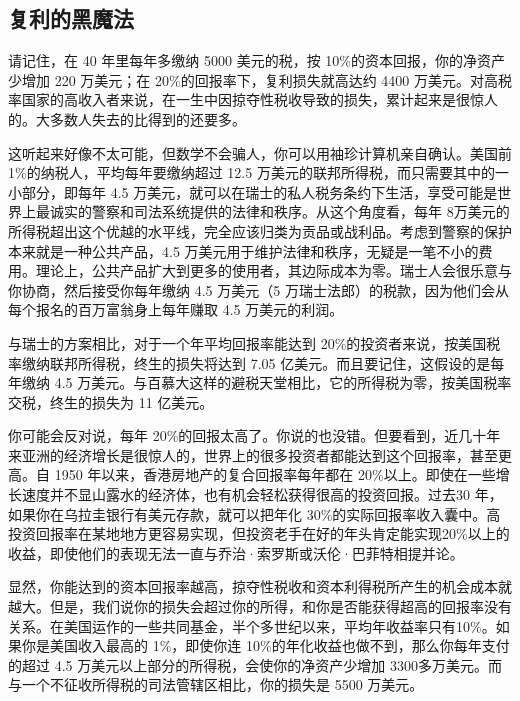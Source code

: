 \subsection{复利的黑魔法}
请记住，在 40 年里每年多缴纳 5000 美元的税，按 10\%的资本回报，你的净资产少增加 220 万美元；在 20\%的回报率下，复利损失就高达约 4400 万美元。对高税率国家的高收入者来说，在一生中因掠夺性税收导致的损失，累计起来是很惊人的。大多数人失去的比得到的还要多。

这听起来好像不太可能，但数学不会骗人，你可以用袖珍计算机亲自确认。美国前 1\%的纳税人，平均每年要缴纳超过 12.5 万美元的联邦所得税，而只需要其中的一小部分，即每年 4.5 万美元，就可以在瑞士的私人税务条约下生活，享受可能是世界上最诚实的警察和司法系统提供的法律和秩序。从这个角度看，每年 8万美元的所得税超出这个优越的水平线，完全应该归类为贡品或战利品。考虑到警察的保护本来就是一种公共产品，4.5 万美元用于维护法律和秩序，无疑是一笔不小的费用。理论上，公共产品扩大到更多的使用者，其边际成本为零。瑞士人会很乐意与你协商，然后接受你每年缴纳 4.5 万美元（5 万瑞士法郎）的税款，因为他们会从每个报名的百万富翁身上每年赚取 4.5 万美元的利润。

与瑞士的方案相比，对于一个年平均回报率能达到 20\%的投资者来说，按美国税率缴纳联邦所得税，终生的损失将达到 7.05 亿美元。而且要记住，这假设的是每年缴纳 4.5 万美元。与百慕大这样的避税天堂相比，它的所得税为零，按美国税率交税，终生的损失为 11 亿美元。

你可能会反对说，每年 20\%的回报太高了。你说的也没错。但要看到，近几十年来亚洲的经济增长是很惊人的，世界上的很多投资者都能达到这个回报率，甚至更高。自 1950 年以来，香港房地产的复合回报率每年都在 20\%以上。即使在一些增长速度并不显山露水的经济体，也有机会轻松获得很高的投资回报。过去30 年，如果你在乌拉圭银行有美元存款，就可以把年化 30\%的实际回报率收入囊中。高投资回报率在某地地方更容易实现，但投资老手在好的年头肯定能实现20\%以上的收益，即使他们的表现无法一直与乔治·索罗斯或沃伦·巴菲特相提并论。

显然，你能达到的资本回报率越高，掠夺性税收和资本利得税所产生的机会成本就越大。但是，我们说你的损失会超过你的所得，和你是否能获得超高的回报率没有关系。在美国运作的一些共同基金，半个多世纪以来，平均年收益率只有10\%。如果你是美国收入最高的 1\%，即使你连 10\%的年化收益也做不到，那么你每年支付的超过 4.5 万美元以上部分的所得税，会使你的净资产少增加 3300多万美元。而与一个不征收所得税的司法管辖区相比，你的损失是 5500 万美元。

